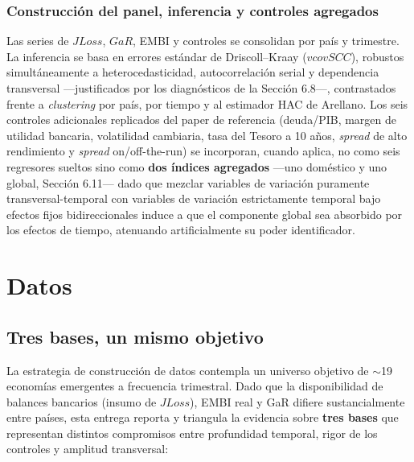 \documentclass[5p,times,twocolumn,authoryear]{elsarticle}
\begin{document}
\subsubsection{Construcción del panel, inferencia y controles agregados}

Las series de $JLoss$, $GaR$, EMBI y controles se consolidan por país y trimestre. La inferencia se basa en errores estándar de Driscoll–Kraay ($vcovSCC$), robustos simultáneamente a heterocedasticidad, autocorrelación serial y dependencia transversal —justificados por los diagnósticos de la Sección 6.8—, contrastados frente a \textit{clustering} por país, por tiempo y al estimador HAC de Arellano. Los seis controles adicionales replicados del paper de referencia (deuda/PIB, margen de utilidad bancaria, volatilidad cambiaria, tasa del Tesoro a 10 años, \textit{spread} de alto rendimiento y \textit{spread} on/off-the-run) se incorporan, cuando aplica, no como seis regresores sueltos sino como \textbf{dos índices agregados} —uno doméstico y uno global, Sección 6.11— dado que mezclar variables de variación puramente transversal-temporal con variables de variación estrictamente temporal bajo efectos fijos bidireccionales induce a que el componente global sea absorbido por los efectos de tiempo, atenuando artificialmente su poder identificador.


\section{Datos}

\subsection{Tres bases, un mismo objetivo}

La estrategia de construcción de datos contempla un universo objetivo de $\sim$19 economías emergentes a frecuencia trimestral. Dado que la disponibilidad de balances bancarios (insumo de $JLoss$), EMBI real y GaR difiere sustancialmente entre países, esta entrega reporta y triangula la evidencia sobre \textbf{tres bases} que representan distintos compromisos entre profundidad temporal, rigor de los controles y amplitud transversal:
\end{document}
